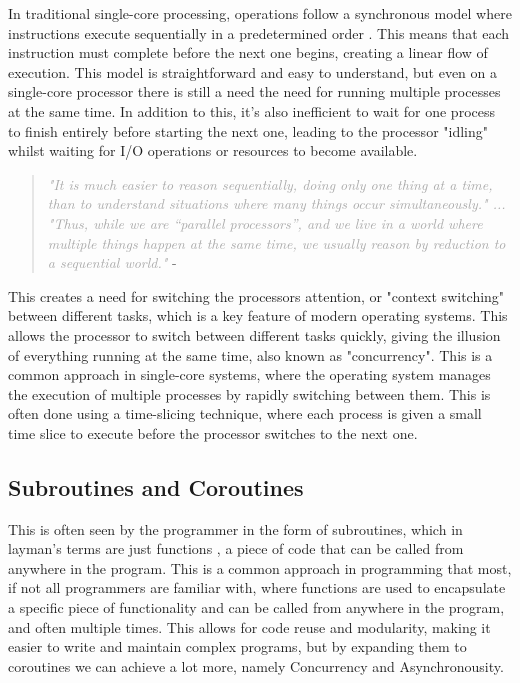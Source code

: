 \documentclass[12pt,a4paper]{article}
\begin{document}
In traditional single-core processing, operations follow a synchronous model where instructions execute sequentially in a predetermined order \parencite[p. 118]{Johnson2015}. This means that each instruction must complete before the next one begins, creating a linear flow of execution. This model is straightforward and easy to understand, but even on a single-core processor there is still a need the need for running multiple processes at the same time. In addition to this, it's also inefficient to wait for one process to finish entirely before starting the next one, leading to the processor "idling" whilst waiting for I/O operations or resources to become available.

\begin{quote}
    \textit{\textcolor{darkgray}{"It is much easier to reason sequentially, doing only one thing at a time, than to understand situations where many things occur simultaneously." ... "Thus, while we are “parallel processors”, and we live in a world where multiple things happen at the same time, we usually reason by reduction to a sequential world."}} - \cite{Rajsbaum2020}
\end{quote}

This creates a need for switching the processors attention, or "context switching" between different tasks, which is a key feature of modern operating systems. This allows the processor to switch between different tasks quickly, giving the illusion of everything running at the same time, also known as "concurrency"\parencite{Rajsbaum2020}. This is a common approach in single-core systems, where the operating system manages the execution of multiple processes by rapidly switching between them. This is often done using a time-slicing technique, where each process is given a small time slice to execute before the processor switches to the next one.

\subsection{Subroutines and Coroutines}

This is often seen by the programmer in the form of subroutines, which in layman's terms are just functions \parencite{Pyeatt2020}, a piece of code that can be called from anywhere in the program. This is a common approach in programming that most, if not all programmers are familiar with, where functions are used to encapsulate a specific piece of functionality and can be called from anywhere in the program, and often multiple times. This allows for code reuse and modularity, making it easier to write and maintain complex programs, but by expanding them to coroutines we can achieve a lot more, namely Concurrency and Asynchronousity. 
\end{document}
